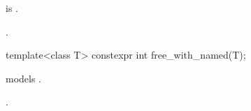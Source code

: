 \begin{itemdescr}
\pnum
\constraints
{} is .

\pnum
\returns
{}.
\end{itemdescr}

%
\begin{itemdecl}
template<class T>
  constexpr int free_with_named(T);
\end{itemdecl}

\begin{itemdescr}
\pnum
\constraints
{} models .

\pnum
\returns
{}.
\end{itemdescr}
